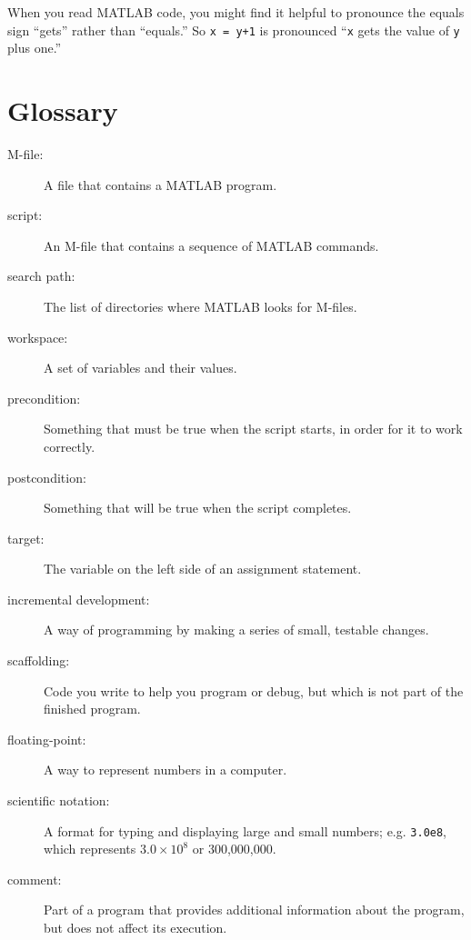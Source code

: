 \documentclass[
]{book}
\numberwithin{Answer}{chapter}
\numberwithin{Exercise}{chapter}
\begin{document}
When you read MATLAB code, you might find it helpful to pronounce
the equals sign ``gets'' rather than ``equals.''  So {\tt x = y+1}
is pronounced ``{\tt x} gets the value of {\tt y} plus one.''


\section{Glossary}

\begin{description}

\item[M-file:] A file that contains a MATLAB program.

\item[script:] An M-file that contains a sequence of MATLAB commands.

\item[search path:] The list of directories where MATLAB looks for
M-files.

\item[workspace:] A set of variables and their values.

\item[precondition:] Something that must be true when the script
starts, in order for it to work correctly.

\item[postcondition:] Something that will be true when the script
completes.

\item[target:] The variable on the left side of an assignment statement.

\item[incremental development:] A way of programming by making a series
of small, testable changes.

\item[scaffolding:] Code you write to help you program or debug, but
which is not part of the finished program.


\item[floating-point:] A way to represent numbers in a computer.

\item[scientific notation:] A format for typing and displaying large
and small numbers; e.g. {\tt 3.0e8}, which represents $3.0 \times 10^8$
or 300,000,000.

\item[comment:] Part of a program that provides additional information
about the program, but does not affect its execution.

\end{description}
\end{document}
